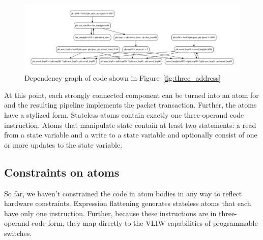 \begin{figure}
  \includegraphics[width=\textwidth]{deps.pdf}
  \caption{Dependency graph of code shown in Figure~\ref{fig:three_address}}
  \label{fig:deps}
\end{figure}

At this point, each strongly connected component can be turned into an atom for
\absmachine and the resulting pipeline implements the packet transaction.
Further, the atoms have a stylized form. Stateless atoms contain exactly
one three-operand code instruction. Atoms that manipulate state contain at
least two statements: a read from a state variable and a write to a state
variable and optionally consist of one or more updates to the state variable.

\subsection{Constraints on atoms}
\label{ss:complexity}
So far, we haven't constrained the code in atom bodies in any way to reflect
hardware constraints. Expression flattening generates stateless atoms that each
have only one instruction. Further, because these instructions are in
three-operand code form, they map directly to the VLIW capabilities of
programmable switches.

